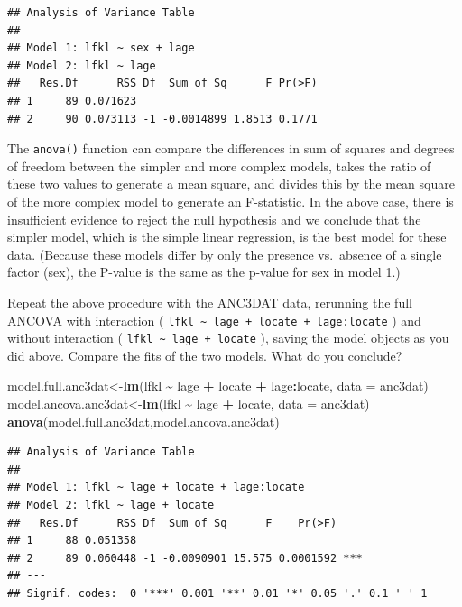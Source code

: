 \documentclass[
  12pt,
]{book}
\makeatletter
\newenvironment{Shaded}{\begin{snugshade}}{\end{snugshade}}
\newcommand{\DataTypeTok}[1]{\textcolor[rgb]{0.13,0.29,0.53}{#1}}
\newcommand{\KeywordTok}[1]{\textcolor[rgb]{0.13,0.29,0.53}{\textbf{#1}}}
\newcommand{\NormalTok}[1]{#1}
\newcommand{\OperatorTok}[1]{\textcolor[rgb]{0.81,0.36,0.00}{\textbf{#1}}}
\newcommand{\StringTok}[1]{\textcolor[rgb]{0.31,0.60,0.02}{#1}}
\newenvironment{kframe}{%
\medskip{}
\setlength{\fboxsep}{.8em}
\def\at@end@of@kframe{}%
\ifinner\ifhmode%
 \def\at@end@of@kframe{\end{minipage}}%
 \begin{minipage}{\columnwidth}%
\fi\fi%
\def\FrameCommand##1{\hskip\@totalleftmargin \hskip-\fboxsep
\colorbox{incolor}{##1}\hskip-\fboxsep
    \hskip-\linewidth \hskip-\@totalleftmargin \hskip\columnwidth}%
\MakeFramed {\advance\hsize-\width
  \@totalleftmargin\z@ \linewidth\hsize
  \@setminipage}}%
{\par\unskip\endMakeFramed%
\at@end@of@kframe}
\newenvironment{rmdblock}[1]
 {
 \begin{itemize}
 \renewcommand{\labelitemi}{
   \raisebox{-.7\height}[0pt][0pt]{
     {\setkeys{Gin}{width=3em,keepaspectratio}\texttt{[image: images/\#1]}}
   }
 }
 \begin{kframe}
 \setlength{\fboxsep}{1em}
 \item
 }
 {
 \end{kframe}
 \end{itemize}
 }
\newenvironment{rmdcode}
  {\begin{rmdblock}{screen}}
  {\end{rmdblock}}
\makeatother
\begin{document}
\begin{verbatim}
## Analysis of Variance Table
## 
## Model 1: lfkl ~ sex + lage
## Model 2: lfkl ~ lage
##   Res.Df      RSS Df  Sum of Sq      F Pr(>F)
## 1     89 0.071623                            
## 2     90 0.073113 -1 -0.0014899 1.8513 0.1771
\end{verbatim}

The \texttt{anova()} function can compare the differences in sum of squares and degrees of freedom between the simpler and more complex models, takes the ratio of these two values to generate a mean square, and divides this by the mean square of the more complex model to generate an F-statistic. In the above case, there is insufficient evidence to reject the null hypothesis and we conclude that the simpler model, which is the simple linear regression, is the best model for these data. (Because these models differ by only the presence vs.~absence of a single factor (sex), the P-value is the same as the p-value for sex in model 1.)

\begin{rmdcode}
Repeat the above procedure with the ANC3DAT data, rerunning the full ANCOVA with interaction ( \texttt{lfkl\ \textasciitilde{}\ lage\ +\ locate\ +\ lage:locate} ) and without interaction ( \texttt{lfkl\ \textasciitilde{}\ lage\ +\ locate} ), saving the model objects as you did above. Compare the fits of the two models. What do you conclude?
\end{rmdcode}

\begin{Shaded}
\begin{Highlighting}[]
\NormalTok{model.full.anc3dat\textless{}{-}}\KeywordTok{lm}\NormalTok{(lfkl }\OperatorTok{\textasciitilde{}}\StringTok{ }\NormalTok{lage }\OperatorTok{+}\StringTok{ }\NormalTok{locate }\OperatorTok{+}\StringTok{ }\NormalTok{lage}\OperatorTok{:}\NormalTok{locate, }\DataTypeTok{data =}\NormalTok{ anc3dat)}
\NormalTok{model.ancova.anc3dat\textless{}{-}}\KeywordTok{lm}\NormalTok{(lfkl }\OperatorTok{\textasciitilde{}}\StringTok{ }\NormalTok{lage }\OperatorTok{+}\StringTok{ }\NormalTok{locate, }\DataTypeTok{data =}\NormalTok{ anc3dat)}
\KeywordTok{anova}\NormalTok{(model.full.anc3dat,model.ancova.anc3dat)}
\end{Highlighting}
\end{Shaded}

\begin{verbatim}
## Analysis of Variance Table
## 
## Model 1: lfkl ~ lage + locate + lage:locate
## Model 2: lfkl ~ lage + locate
##   Res.Df      RSS Df  Sum of Sq      F    Pr(>F)    
## 1     88 0.051358                                   
## 2     89 0.060448 -1 -0.0090901 15.575 0.0001592 ***
## ---
## Signif. codes:  0 '***' 0.001 '**' 0.01 '*' 0.05 '.' 0.1 ' ' 1
\end{verbatim}
\end{document}
